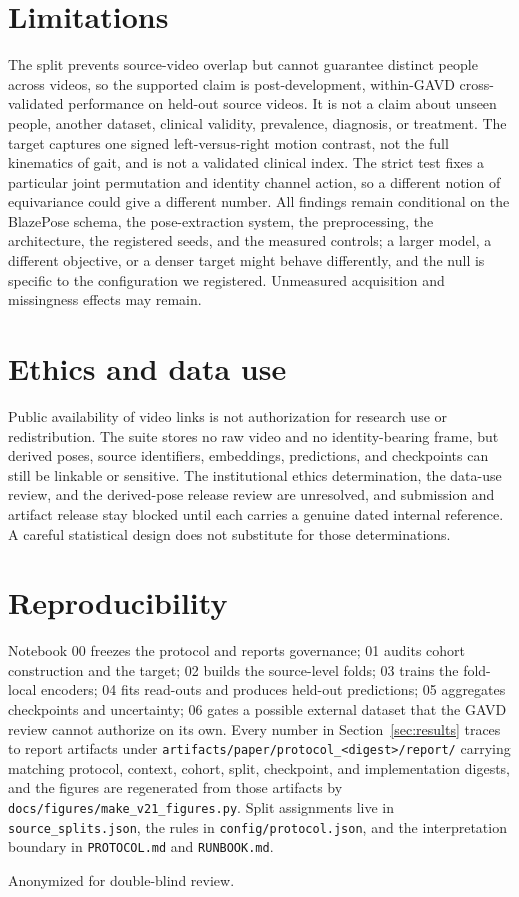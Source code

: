\documentclass{article}
\begin{document}
\section{Limitations}
\label{sec:limits}

The split prevents source-video overlap but cannot guarantee distinct people across videos, so the supported claim is post-development, within-GAVD cross-validated performance on held-out source videos. It is not a claim about unseen people, another dataset, clinical validity, prevalence, diagnosis, or treatment. The target captures one signed left-versus-right motion contrast, not the full kinematics of gait, and is not a validated clinical index. The strict test fixes a particular joint permutation and identity channel action, so a different notion of equivariance could give a different number. All findings remain conditional on the BlazePose schema, the pose-extraction system, the preprocessing, the architecture, the registered seeds, and the measured controls; a larger model, a different objective, or a denser target might behave differently, and the null is specific to the configuration we registered. Unmeasured acquisition and missingness effects may remain.

\section{Ethics and data use}

Public availability of video links is not authorization for research use or redistribution. The suite stores no raw video and no identity-bearing frame, but derived poses, source identifiers, embeddings, predictions, and checkpoints can still be linkable or sensitive. The institutional ethics determination, the data-use review, and the derived-pose release review are unresolved, and submission and artifact release stay blocked until each carries a genuine dated internal reference. A careful statistical design does not substitute for those determinations.

\section{Reproducibility}

Notebook 00 freezes the protocol and reports governance; 01 audits cohort construction and the target; 02 builds the source-level folds; 03 trains the fold-local encoders; 04 fits read-outs and produces held-out predictions; 05 aggregates checkpoints and uncertainty; 06 gates a possible external dataset that the GAVD review cannot authorize on its own. Every number in Section~\ref{sec:results} traces to report artifacts under \texttt{artifacts/paper/protocol\_\allowbreak<digest>/report/} carrying matching protocol, context, cohort, split, checkpoint, and implementation digests, and the figures are regenerated from those artifacts by \texttt{docs/figures/make\_v21\_figures.py}. Split assignments live in \texttt{source\_splits.json}, the rules in \texttt{config/protocol.json}, and the interpretation boundary in \texttt{PROTOCOL.md} and \texttt{RUNBOOK.md}.

\begin{ack}
Anonymized for double-blind review.
\end{ack}

{\small


}
\end{document}
